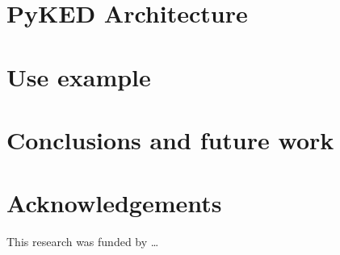 \documentclass[12pt]{ussci}
\begin{document}
\section{PyKED Architecture}
%

\section{Use example}
%


\section{Conclusions and future work}
%



\section{Acknowledgements}
This research was funded by \ldots
{}


\printbibliography
\end{document}
